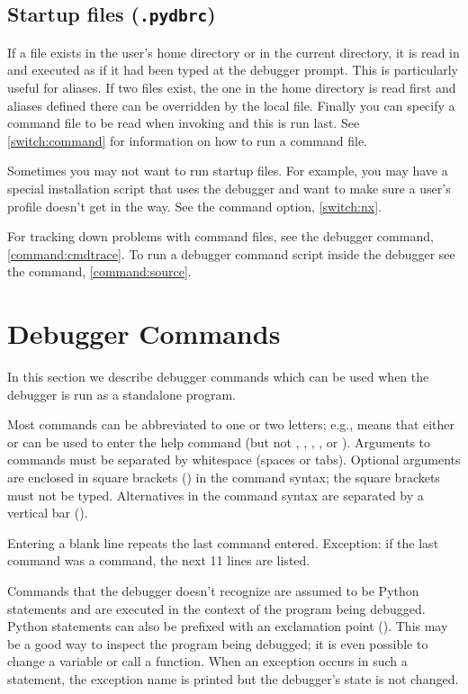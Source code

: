 \subsection{Startup files ({\tt .pydbrc})\label{subsection-startup-files}}

If a file 
 exists
in the user's home directory or in the current directory, it is read
in and executed as if it had been typed at the debugger prompt.  This
is particularly useful for aliases.  If two files exist, the one in
the home directory is read first and aliases defined there can be
overridden by the local file. Finally you can specify a command file
to be read when invoking  and this is run last. See
\ref{switch:command} for information on how to run a command file.

Sometimes you may not want to run startup files. For example,
you may have a special installation script that uses the debugger and
want to make sure a user's profile doesn't get in the way. See
the  command option, \ref{switch:nx}.

For tracking down problems with command files, see the  debugger command, \ref{command:cmdtrace}. To run a
debugger command script inside the debugger see the 
command, \ref{command:source}.

\section{Debugger Commands\label{pydb-commands}}

In this section we describe debugger commands which can be used when
the debugger is run as a standalone program.

Most commands can be abbreviated to one or two letters;
e.g.,  means that either  or  can be
used to enter the help command (but not , ,
, , or ).  Arguments to commands must
be separated by whitespace (spaces or tabs).  Optional arguments are
enclosed in square brackets (\samp{[]}) in the command syntax; the
square brackets must not be typed.  Alternatives in the command syntax
are separated by a vertical bar (\samp{|}).

Entering a blank line repeats the last command entered.  Exception: if
the last command was a  command, the next 11 lines are
listed.

Commands that the debugger doesn't recognize are assumed to be Python
statements and are executed in the context of the program being
debugged.  Python statements can also be prefixed with an exclamation
point (\samp{!}).  This may be a good way to inspect the program being
debugged; it is even possible to change a variable or call a function.
When an exception occurs in such a statement, the exception name is
printed but the debugger's state is not changed.

